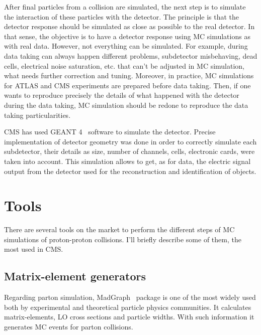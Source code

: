 After final particles from a collision are simulated, the next step is to simulate the interaction of these particles with the detector. The principle is that the detector response should be simulated as close as possible to the real detector. In that sense, the objective is to have a detector response using MC simulations as with real data. However, not everything can be simulated. For example, during data taking can always happen different problems, subdetector misbehaving, dead cells, electrical noise saturation, etc. that can't be adjusted in MC simulation, what needs further correction and tuning. Moreover, in practice, MC simulations for ATLAS and CMS experiments are prepared before data taking. Then, if one wants to reproduce precisely the details of what happened with the detector during the data taking, MC simulation should be redone to reproduce the data taking particularities. 

CMS has used GEANT 4~\cite{Agostinelli:2002hh} software to simulate the detector. Precise implementation of detector geometry was done in order to correctly simulate each subdetector, their details as size, number of channels, cells, electronic cards, were taken into account. This simulation allows to get, as for data, the electric signal output from the detector used for the reconstruction and identification of objects. 


\section{Tools}
\label{sec:tools}

There are several tools on the market to perform the different steps of MC simulations of proton-proton collisions. I'll briefly describe some of them, the most used in CMS.

\subsection{Matrix-element generators}
\label{sec:ME}

Regarding parton simulation, MadGraph~\cite{Alwall:2014hca, Alwall:2011uj} package is one of the most widely used both by experimental and theoretical particle physics communities. It calculates matrix-elements, LO cross sections and particle widths. With such information it generates MC events for parton collisions. 

